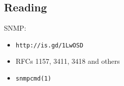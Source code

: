 \documentclass[xga]{xdvislides}
\begin{document}
\subsection{Reading}
SNMP:
\begin{itemize}
	\item \verb+http://is.gd/1LwOSD+
	\item RFCs 1157, 3411, 3418 and others
	\item \verb+snmpcmd(1)+
\end{itemize}
%
%
\end{document}
